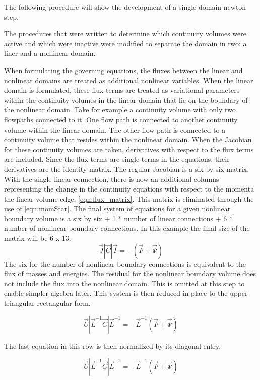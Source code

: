 The following procedure will show the development of a single domain newton step.


The procedures that were written to determine which continuity volumes were active and which were inactive were modified to separate the domain in two: a liner and a nonlinear domain.

When formulating the governing equations, the fluxes between the linear and nonlinear domains are treated as additional nonlinear variables.
When the linear domain is formulated, these flux terms are treated as variational parameters within the continuity volumes in the linear domain that lie on the boundary of the nonlinear domain.
Take for example a continuity volume with only two flowpaths connected to it.
One flow path is connected to another continuity volume within the linear domain.
The other flow path is connected to a continuity volume that resides within the nonlinear domain.
When the Jacobian for these continuity volumes are taken, derivatives with respect to the flux terms are included.
Since the flux terms are single terms in the equations, their derivatives are the identity matrix.
The regular Jacobian is a six by six matrix.
With the single linear connection, there is now an additional columns representing the change in the continuity equations with respect to the momenta the linear volume edge, \eqref{eqn:flux_matrix}.
This matrix is eliminated through the use of \eqref{eqn:momStar}.
The final system of equations for a given nonlinear boundary volume is a six by six + 1 * number of linear connections + 6 * number of nonlinear boundary connections.
In this example the final size of the matrix will be 6 x 13.
\begin{equation}
\vec{J}|\vec{C}|\vec{I} = -(\vec{F} + \vec{\Psi})
\end{equation}
The six for the number of nonlinear boundary connections is equivalent to the flux of masses and energies.
The residual for the nonlinear boundary volume does not include the flux into the nonlinear domain.
This is omitted at this step to enable simpler algebra later.
This system is then reduced in-place to the upper-triangular rectangular form. 

\begin{equation}
\vec{U}|\vec{L}^{-1}\vec{C}|\vec{L}^{-1} = -\vec{L}^{-1}(\vec{F} + \vec{\Psi})
\end{equation}

The last equation in this row is then normalized by its diagonal entry.

\begin{equation}
\vec{U}|\vec{L}^{-1}\vec{C}|\vec{L}^{-1} = -\vec{L}^{-1}(\vec{F} + \vec{\Psi})
\end{equation}

